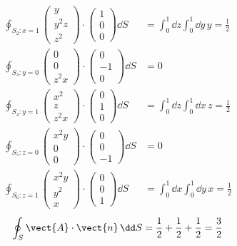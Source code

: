 \begin{align*}
\oint_{S_{2}:x=1}\begin{pmatrix}y\\y^{2}z\\z^{2}\end{pmatrix}\cdot\begin{pmatrix}1\\0\\0\end{pmatrix}\dd S&=\int_{0}^{1}\dd z\int_{0}^{1}\dd y\,y=\frac{1}{2}\\
\oint_{S_{3}:y=0}\begin{pmatrix}0\\0\\z^{2}x\end{pmatrix}\cdot\begin{pmatrix}0\\-1\\0\end{pmatrix}\dd S&=0\\
\oint_{S_{4}:y=1}\begin{pmatrix}x^{2}\\z\\z^{2}x\end{pmatrix}\cdot\begin{pmatrix}0\\1\\0\end{pmatrix}\dd S&=\int_{0}^{1}\dd z\int_{0}^{1}\dd x\,z=\frac{1}{2}\\
\oint_{S_{5}:z=0}\begin{pmatrix}x^{2}y\\0\\0\end{pmatrix}\cdot\begin{pmatrix}0\\0\\-1\end{pmatrix}\dd S&=0\\
\oint_{S_{6}:z=1}\begin{pmatrix}x^{2}y\\y^{2}\\x\end{pmatrix}\cdot\begin{pmatrix}0\\0\\1\end{pmatrix}\dd S&=\int_{0}^{1}\dd x\int_{0}^{1}\dd y\,x=\frac{1}{2}
\end{align*}
\[ \oint_{S}\vect{A}\cdot\vect{n}\,\dd S=\frac{1}{2}+\frac{1}{2}+\frac{1}{2}=\frac{3}{2} \]
